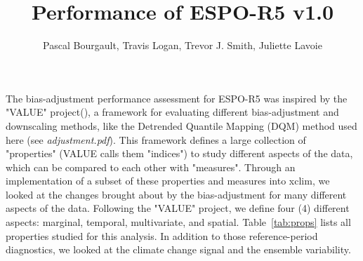 \documentclass[letterpaper,10pt]{article}
\begin{document}
\title{Performance of ESPO-R5 v1.0}
\author{Pascal Bourgault, Travis Logan, Trevor J. Smith, Juliette Lavoie}
\maketitle

The bias-adjustment performance assessment for ESPO-R5 was inspired by the "VALUE" project(\cite{Maraun2015}), a framework for evaluating different bias-adjustment and downscaling methods, like the Detrended Quantile Mapping (DQM) method used here (see \emph{adjustment.pdf}).
This framework defines a large collection of "properties" (VALUE calls them "indices") to study different aspects of the data, which can be compared to each other with "measures".
Through an implementation of a subset of these properties and measures into xclim, we looked at the changes brought about by the bias-adjustment for many different aspects of the data.
Following the "VALUE" project, we define four (4) different aspects: marginal, temporal, multivariate, and spatial. Table~\ref{tab:props} lists all properties studied for this analysis.
In addition to those reference-period diagnostics, we looked at the climate change signal and the ensemble variability.
\end{document}
